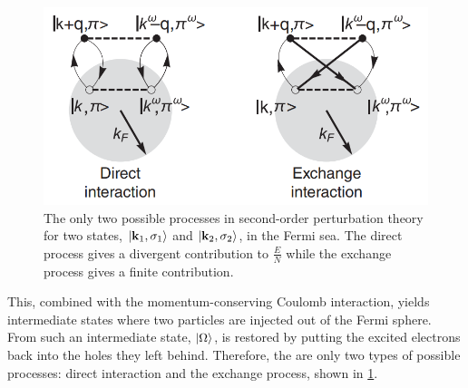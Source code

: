 \documentclass{homework}
\begin{document}
\begin{figure}
    \centering
    \includegraphics[scale = .5]{figs/Jellium model/fermi_sea_loops_second_order.png}
    \caption{The only two possible processes in second-order perturbation theory for two states, $\ket{{\bf k}_1, \sigma_1}$ and $\ket{{\bf k}_2, \sigma_2}$, in the Fermi sea. The direct process gives a divergent contribution to $\frac{E}{N}$ while the exchange process gives a finite contribution.}
    \label{fig:fermi_sea_loops_second_order}
\end{figure}

This, combined with the momentum-conserving Coulomb interaction, yields intermediate states where two particles are injected out of the Fermi sphere. From such an intermediate state, $\ket{\Omega}$, is restored by putting the excited electrons back into the holes they left behind. Therefore, the are only two types of possible processes: direct interaction and the exchange process, shown in \cref{fig:fermi_sea_loops_second_order}. \\
\end{document}
